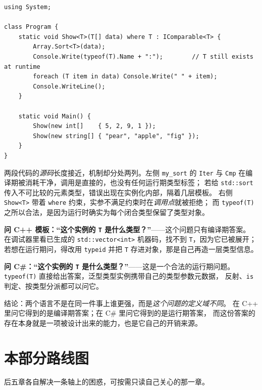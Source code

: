 \documentclass[12pt,a4paper,fontset=fandol]{ctexbook}
\newcommand{\csharplabel}{%
  \tcbox[on line,colback=csharpheadbg,colframe=csharpheadbg,
    boxrule=0pt,arc=1pt,left=2pt,right=2pt,top=1pt,bottom=1pt,
    colupper=white,fontupper=\scriptsize\bfseries]{C\#}}
\newcommand{\cpp}[1]{C++#1}
\newcommand{\kw}[1]{\texttt{#1}}
\begin{document}
\csharplabel
\begin{lstlisting}[style=csharpstyle,caption={C\#：类型参数在运行期仍然可问，代价是运行时必须理解它}]
using System;

class Program {
    static void Show<T>(T[] data) where T : IComparable<T> {
        Array.Sort<T>(data);
        Console.Write(typeof(T).Name + ":");        // T still exists at runtime
        foreach (T item in data) Console.Write(" " + item);
        Console.WriteLine();
    }

    static void Main() {
        Show(new int[]    { 5, 2, 9, 1 });
        Show(new string[] { "pear", "apple", "fig" });
    }
}
\end{lstlisting}

两段代码的\emph{源码}长度接近，机制却分处两列。左侧 \kw{my\_sort} 的 \kw{Iter} 与 \kw{Cmp}
在编译期被消耗干净，调用是直接的，也没有任何运行期类型标签；
若给 \kw{std::sort} 传入不可比较的元素类型，错误出现在实例化内部，隔着几层模板。
右侧 \kw{Show<T>} 带着 \kw{where} 约束，实参不满足约束时在\emph{调用点}就被拒绝；
而 \kw{typeof(T)} 之所以合法，是因为运行时确实为每个闭合类型保留了类型对象。

\begin{compare}[title={问“\kw{T} 是什么类型”的两个问题合法性不同}]
\textbf{问 \cpp{} 模板：“这个实例的 \kw{T} 是什么类型？”}——这个问题只有编译期答案。
在调试器里看已生成的 \kw{std::vector<int>} 机器码，找不到 \kw{T}，因为它已被展开；
若想在运行期问，得改用 \kw{typeid} 并把 \kw{T} 存进对象，那是自己再造一层类型信息。

\textbf{问 C\#：“这个实例的 \kw{T} 是什么类型？”}——这是一个合法的运行期问题。
\kw{typeof(T)} 直接给出答案，泛型类型实例携带自己的类型参数元数据，
反射、\kw{is} 判定、按类型分派都可以问它。

结论：两个语言不是在同一件事上谁更强，而是\emph{这个问题的定义域不同}。
在 \cpp{} 里问它得到的是编译期答案；在 C\# 里问它得到的是运行期答案，
而这份答案的存在本身就是一项被设计出来的能力，也是它自己的开销来源。
\end{compare}

\section{本部分路线图}

后五章各自解决一条轴上的困惑，可按需只读自己关心的那一章。
\end{document}
